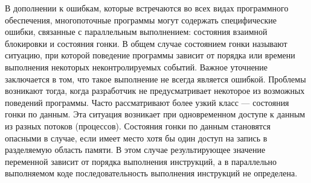 


В дополнении к ошибкам, которые встречаются во всех видах программного обеспечения, многопоточные программы могут содержать специфические ошибки, связанные с параллельным выполнением: состояния взаимной блокировки и состояния гонки.
В общем случае состоянием гонки называют ситуацию, при которой поведение программы зависит от порядка или времени выполнения некоторых неконтролируемых событий.
Важное уточнение заключается в том, что такое выполнение не всегда является ошибкой.
Проблемы возникают тогда, когда разработчик не предусматривает некоторое из возможных поведений программы.
Часто рассматривают более узкий класс — состояния гонки по данным. Эта ситуация возникает при одновременном доступе к данным из разных потоков (процессов).
Состояния гонки по данным становятся опасными в случае, если имеет место хотя бы один доступ на запись в разделяемую область памяти.
В этом случае результирующее значение переменной зависит от порядка выполнения инструкций, а в параллельно выполняемом коде последовательность выполнения инструкций не определена. 

